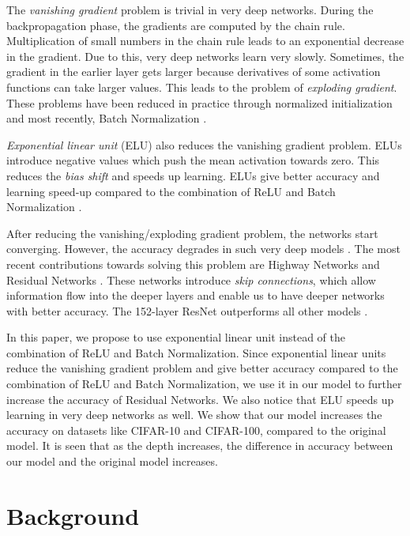 \documentclass[10pt,twocolumn,letterpaper]{article}
\begin{document}
The \emph{vanishing gradient} problem is trivial in very deep networks. During the backpropagation phase, the gradients are computed by the chain rule. Multiplication of small numbers in the chain rule leads to an exponential decrease in the gradient. Due to this, very deep networks learn very slowly. Sometimes, the gradient in the earlier layer gets larger because derivatives of some activation functions can take larger values. This leads to the problem of \emph{exploding gradient}. These problems have been reduced in practice through normalized initialization \cite{[3]} and most recently, Batch Normalization \cite{[4]}.

\emph{Exponential linear unit} (ELU) \cite{[9]} also reduces the vanishing gradient problem. ELUs introduce negative values which push the mean activation towards zero. This reduces the \emph{bias shift} and speeds up learning. ELUs give better accuracy and learning speed-up compared to the combination of ReLU \cite{[8]} and Batch Normalization \cite{[4]}.

After reducing the vanishing/exploding gradient problem, the networks start converging. However, the accuracy degrades in such very deep models \cite{[1]}. The most recent contributions towards solving this problem are Highway Networks \cite{[7]} and Residual Networks \cite{[1]}. These networks introduce \emph{skip connections}, which allow information flow into the deeper layers and enable us to have deeper networks with better accuracy. The 152-layer ResNet outperforms all other models \cite{[1]}.

In this paper, we propose to use exponential linear unit instead of the combination of ReLU and Batch Normalization. Since exponential linear units reduce the vanishing gradient problem and give better accuracy compared to the combination of ReLU and Batch Normalization, we use it in our model to further increase the accuracy of Residual Networks. We also notice that ELU speeds up learning in very deep networks as well. We show that our model increases the accuracy on datasets like CIFAR-10 and CIFAR-100, compared to the original model. It is seen that as the depth increases, the difference in accuracy between our model and the original model increases.


\section{Background}
\end{document}
